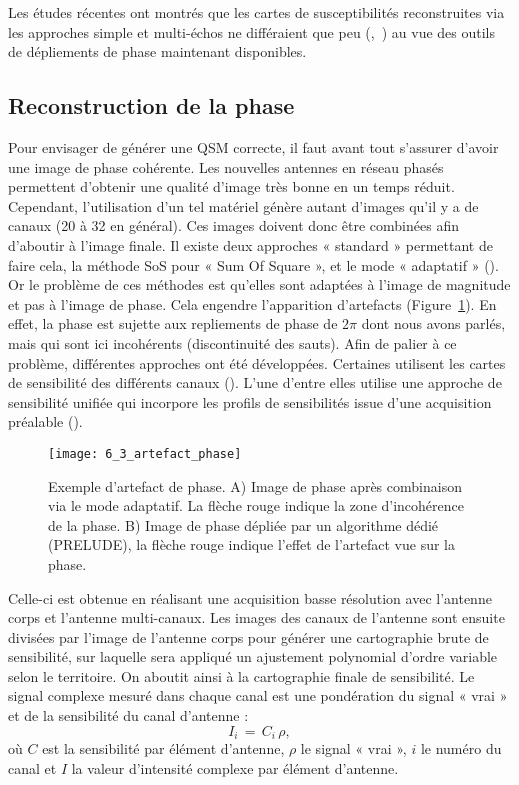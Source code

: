 {Les études récentes ont montrés que les cartes de susceptibilités reconstruites via les
approches simple et multi-échos ne différaient que peu (\cite{Bilgic2012},~\cite{Schweser2012}) au vue des outils de dépliements
de phase maintenant disponibles.

\subsection{Reconstruction de la phase}
\label{sec:reconstruction}
Pour envisager de générer une QSM correcte, il faut avant tout s’assurer d’avoir une image de
phase cohérente. Les nouvelles antennes en réseau phasés permettent d’obtenir une qualité d’image
très bonne en un temps réduit. Cependant, l’utilisation d’un tel matériel génère autant d’images qu’il
y a de canaux (20 à 32 en général). Ces images doivent donc être combinées afin d’aboutir à l’image
finale. Il existe deux approches « standard » permettant de faire cela, la méthode SoS pour « Sum Of
Square », et le mode « adaptatif » (\cite{Walsh2000}). Or le problème de ces méthodes est qu’elles sont adaptées à
l’image de magnitude et pas à l’image de phase. Cela engendre l’apparition d’artefacts (Figure~\ref{fig:6_3_artefact_phase}). En
effet, la phase est sujette aux repliements de phase de $2\pi$ dont nous avons parlés, mais qui sont ici
incohérents (discontinuité des sauts). Afin de palier à ce problème, différentes approches ont été
développées. Certaines utilisent les cartes de sensibilité des différents canaux (\cite{Robinson2011}). L’une d’entre elles
utilise une approche de sensibilité unifiée qui incorpore les profils de sensibilités issue d’une
acquisition préalable (\cite{Ros2009}).
\begin{figure}[!t]
\centering
\texttt{[image: 6\_3\_artefact\_phase]}
\caption{Exemple d'artefact de phase. A) Image de phase après combinaison via le mode adaptatif. La flèche rouge
indique la zone d'incohérence de la phase. B) Image de phase dépliée par un algorithme dédié (PRELUDE), la flèche
rouge indique l'effet de l'artefact vue sur la phase.}
\label{fig:6_3_artefact_phase}	
\end{figure}
Celle-ci est obtenue en réalisant une acquisition basse résolution avec l’antenne corps et l’antenne
multi-canaux. Les images des canaux de l’antenne sont ensuite divisées par l’image de l’antenne corps
pour générer une cartographie brute de sensibilité, sur laquelle sera appliqué un ajustement
polynomial d’ordre variable selon le territoire. On aboutit ainsi à la cartographie finale de sensibilité.
Le signal complexe mesuré dans chaque canal est une pondération du signal « vrai » et de la sensibilité
du canal d’antenne :
\begin{equation}
I_i \,=\,C_i\,\rho,
\end{equation}
où $C$ est la sensibilité par élément d’antenne, $\rho$ le signal « vrai », $i$ le numéro du canal et $I$ la valeur
d’intensité complexe par élément d’antenne.

}
